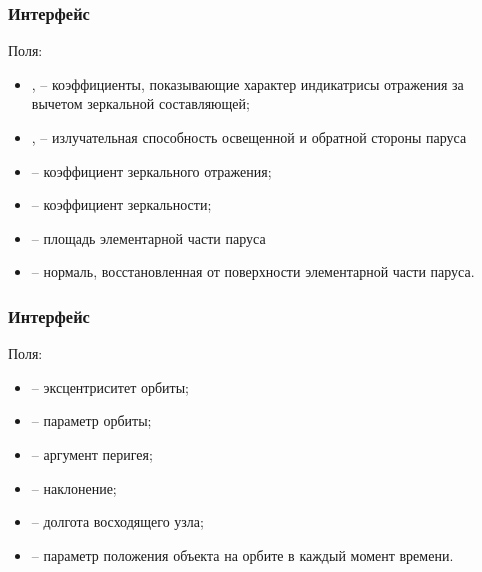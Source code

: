 \subsubsection{Интерфейс }
\noindent\indent Поля:
\begin{itemize}
    \item {},  -- коэффициенты, показывающие характер индикатрисы отражения
    за вычетом зеркальной составляющей;
    \item {},  -- излучательная способность освещенной и обратной стороны паруса
    \item {} -- коэффициент зеркального отражения;
    \item {} -- коэффициент зеркальности;
    \item {} -- площадь элементарной части паруса
    \item {} -- нормаль, восстановленная от поверхности элементарной части паруса.
\end{itemize}
\subsubsection{Интерфейс }
\noindent\indent Поля:
\begin{itemize}
    \item {} -- эксцентриситет орбиты;
    \item {} -- параметр орбиты;
    \item {} -- аргумент перигея;
    \item {} -- наклонение;
    \item {} -- долгота восходящего узла;
    \item {} -- параметр положения объекта на орбите в каждый момент времени.
\end{itemize}
